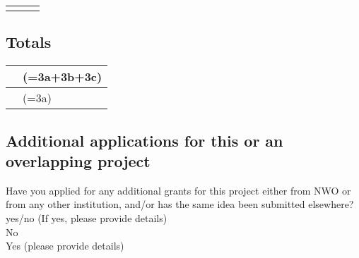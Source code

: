 \begin{tabular}[c]{|o{3.6cm}|o{6.5cm}|o{4.6cm}|}
    \hline
    &&\\
    \hline
     & &\\
    \hline
\end{tabular}


\subsection{Totals}\label{sec:totals}

\begin{tabular}{|w{3.6cm}|p{11.54cm}|}
    \hline
     & (=3a+3b+3c)\\
    \hline
     & (=3a)\\
    \hline
\end{tabular}


\subsection{Additional applications for this or an overlapping project}\label{sec:addapp}

Have you applied for any additional grants for this project either from NWO or from any other institution, and/or has the same idea been submitted elsewhere? yes/no (If yes, please provide details)\\
\checkedbox No\\
\checkbox Yes (please provide details)\\

